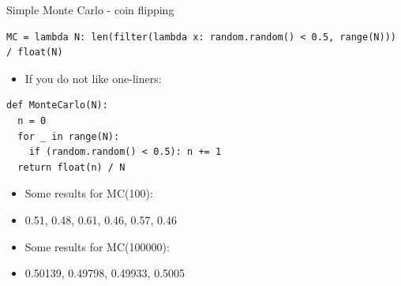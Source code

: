 \begin{wideslide}[toc = Simple Monte Carlo, method=direct]{Simple Monte Carlo - coin flipping}
  {\small\color{pdcolor3}
  \begin{verbatim}
MC = lambda N: len(filter(lambda x: random.random() < 0.5, range(N))) / float(N)     
  \end{verbatim}
  }
  \begin{minipage}{0.55\textwidth}
  \begin{itemize}
   \item If you do not like one-liners:
  \end{itemize}
  \vspace{-20pt}  
  {\small\color{pdcolor3}
  \begin{verbatim}
def MonteCarlo(N):
  n = 0
  for _ in range(N):
    if (random.random() < 0.5): n += 1
  return float(n) / N   
  \end{verbatim}
  }
  \end{minipage}\begin{minipage}{0.45\textwidth}
		  \vspace{-10pt}
		  \begin{itemize}
		   \item Some results for MC(100):
		   \item[]
		   0.51, 0.48, 0.61, 0.46, 0.57, 0.46
		   \item Some results for MC(100000):
		   \item[]
		   0.50139, 0.49798, 0.49933, 0.5005
		  \end{itemize}
                \end{minipage}

\vfill\null
\end{wideslide}